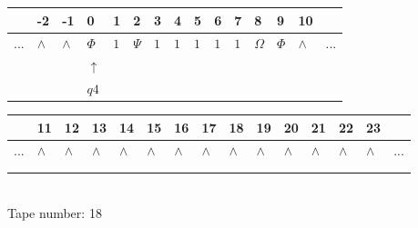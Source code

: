 \documentclass[11pt]{article}
\begin{document}
\begin{table}[H]
\centering
\begin{tabular}{lllllllllllllll}
 & -2 & -1 & 0 & 1 & 2 & 3 & 4 & 5 & 6 & 7 & 8 & 9 & 10 & \\
\hline
$...$ & \multicolumn{1}{|l|}{$\wedge$} & \multicolumn{1}{|l|}{$\wedge$} & \multicolumn{1}{|l|}{$\Phi$} & \multicolumn{1}{|l|}{$1$} & \multicolumn{1}{|l|}{$\Psi$} & \multicolumn{1}{|l|}{$1$} & \multicolumn{1}{|l|}{$1$} & \multicolumn{1}{|l|}{$1$} & \multicolumn{1}{|l|}{$1$} & \multicolumn{1}{|l|}{$1$} & \multicolumn{1}{|l|}{$\Omega$} & \multicolumn{1}{|l|}{$\Phi$} & \multicolumn{1}{|l|}{$\wedge$} & $...$\\
\hline
&  &  & $\uparrow$ &  &  &  &  &  &  &  &  &  &  &  \\
&  &  & $ q4 $ &  &  &  &  &  &  &  &  &  &  &  \\
\end{tabular}
\begin{tabular}{lllllllllllllll}
 & 11 & 12 & 13 & 14 & 15 & 16 & 17 & 18 & 19 & 20 & 21 & 22 & 23 & \\
\hline
$...$ & \multicolumn{1}{|l|}{$\wedge$} & \multicolumn{1}{|l|}{$\wedge$} & \multicolumn{1}{|l|}{$\wedge$} & \multicolumn{1}{|l|}{$\wedge$} & \multicolumn{1}{|l|}{$\wedge$} & \multicolumn{1}{|l|}{$\wedge$} & \multicolumn{1}{|l|}{$\wedge$} & \multicolumn{1}{|l|}{$\wedge$} & \multicolumn{1}{|l|}{$\wedge$} & \multicolumn{1}{|l|}{$\wedge$} & \multicolumn{1}{|l|}{$\wedge$} & \multicolumn{1}{|l|}{$\wedge$} & \multicolumn{1}{|l|}{$\wedge$} & $...$\\
\hline
&  &  &  &  &  &  &  &  &  &  &  &  &  &  \\
&  &  &  &  &  &  &  &  &  &  &  &  &  &  \\
\end{tabular}
\\
Tape number: 18
\noindent\makebox[\linewidth]{\hdashrule{\textwidth}{1pt}{1pt}}\end{table}
\end{document}
